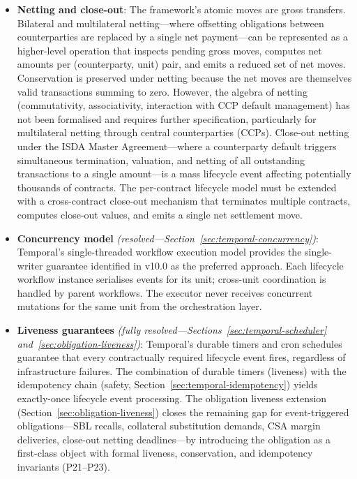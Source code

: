 \documentclass[11pt,a4paper]{article}
\begin{document}
\begin{itemize}
\item \textbf{Netting and close-out}: The framework's atomic moves are gross transfers. Bilateral and multilateral netting---where offsetting obligations between counterparties are replaced by a single net payment---can be represented as a higher-level operation that inspects pending gross moves, computes net amounts per (counterparty, unit) pair, and emits a reduced set of net moves. Conservation is preserved under netting because the net moves are themselves valid transactions summing to zero. However, the algebra of netting (commutativity, associativity, interaction with CCP default management) has not been formalised and requires further specification, particularly for multilateral netting through central counterparties (CCPs). Close-out netting under the ISDA Master Agreement---where a counterparty default triggers simultaneous termination, valuation, and netting of all outstanding transactions to a single amount---is a mass lifecycle event affecting potentially thousands of contracts. The per-contract lifecycle model must be extended with a cross-contract close-out mechanism that terminates multiple contracts, computes close-out values, and emits a single net settlement move.

\item \textbf{Concurrency model} \textit{(resolved---Section~\ref{sec:temporal-concurrency})}: Temporal's single-threaded workflow execution model provides the single-writer guarantee identified in v10.0 as the preferred approach. Each lifecycle workflow instance serialises events for its unit; cross-unit coordination is handled by parent workflows. The executor never receives concurrent mutations for the same unit from the orchestration layer.

\item \textbf{Liveness guarantees} \textit{(fully resolved---Sections~\ref{sec:temporal-scheduler} and~\ref{sec:obligation-liveness})}: Temporal's durable timers and cron schedules guarantee that every contractually required lifecycle event fires, regardless of infrastructure failures. The combination of durable timers (liveness) with the idempotency chain (safety, Section~\ref{sec:temporal-idempotency}) yields exactly-once lifecycle event processing. The obligation liveness extension (Section~\ref{sec:obligation-liveness}) closes the remaining gap for event-triggered obligations---SBL recalls, collateral substitution demands, CSA margin deliveries, close-out netting deadlines---by introducing the obligation as a first-class object with formal liveness, conservation, and idempotency invariants (P21--P23).


\end{itemize}
\end{document}
